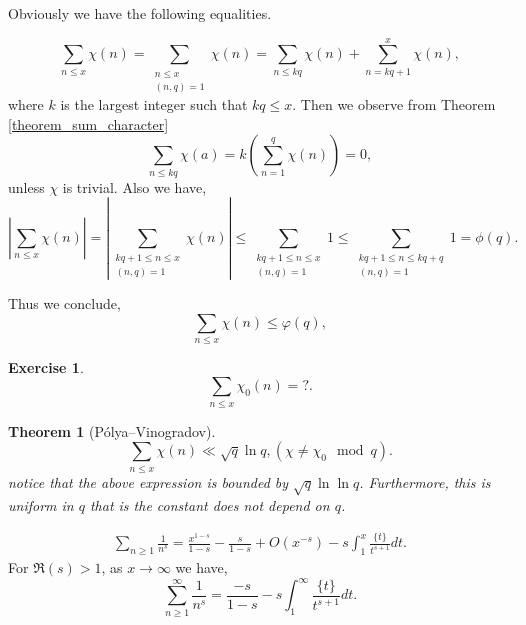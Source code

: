 \documentclass{article}
\newtheorem{theorem}{Theorem} [section]
\newtheorem{exercise}{Exercise}[section]
\begin{document}
Obviously we have the following equalities.

\begin{equation*}
  \sum_{n\leq x}\chi(n) = \sum_{\substack{n\leq x \\ (n,q) =1}}\chi(n) = \sum_{n\leq kq}\chi(n) + \sum_{n=kq+1}^x\chi(n),
\end{equation*}
where $k$ is the largest integer such that $kq\leq x$.
Then we observe from Theorem \ref{theorem_sum_character}
\begin{equation*}
  \sum_{n\leq kq}\chi(a) = k\left(\sum_{n=1}^q\chi(n)\right) = 0,
\end{equation*}
unless $\chi$ is trivial.
Also we have,
\begin{equation*}
  \left\vert\sum_{n\leq x}\chi(n)\right\vert = \left\vert\sum_{\substack{kq+1\leq n\leq x\\ (n,q)=1}}\chi(n)\right\vert\leq \sum_{\substack{kq+1\leq n\leq x\\ (n,q)=1}}1 \leq \sum_{\substack{kq+1\leq n\leq kq+q\\ (n,q)=1}}1=\phi(q).
\end{equation*}

Thus we conclude,
\begin{equation*}
  \sum_{n\leq x}\chi(n)\leq \varphi(q),
\end{equation*}
\begin{exercise}
  \begin{equation*}
    \sum_{n\leq x}\chi_0(n) = ?.
  \end{equation*}
\end{exercise}
\begin{theorem}[Pólya–Vinogradov]
  \label{theorem_polya_vinogradov}
\begin{equation*}
  \sum_{n\leq x}\chi(n)\ll \sqrt{q}\ln q, (\chi\not=\chi_0\mod q).
\end{equation*}
notice that the above expression is bounded by $\sqrt{q}\ln\ln q$. Furthermore, this is uniform in $q$ that is the constant does not depend on $q$.
\end{theorem}

\begin{align*}
  \sum_{n\geq 1}{\frac 1 {n^s}}={\frac {x^{1-s}} {1-s}} - {\frac {s} {1-s}}+O(x^{-s}) -s\int_1^x{\frac {\{t\}} {t^{s+1}}}dt.
\end{align*}
For $\Re(s)>1$, as $x\to\infty$ we have,
\begin{equation*}
  \sum_{n\geq 1}^\infty {\frac 1 {n^s}} = {\frac {-s} {1-s}}-s\int_1^\infty {\frac {\{t\}} {t^{s+1}}}dt.
\end{equation*}
\end{document}
